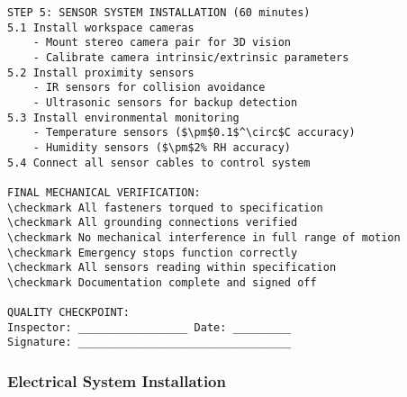 \begin{lstlisting}[basicstyle=\ttfamily\footnotesize, caption={Step-by-Step Mechanical Assembly}, label={lst:app-mechanical}]
STEP 5: SENSOR SYSTEM INSTALLATION (60 minutes)
5.1 Install workspace cameras
    - Mount stereo camera pair for 3D vision
    - Calibrate camera intrinsic/extrinsic parameters
5.2 Install proximity sensors
    - IR sensors for collision avoidance
    - Ultrasonic sensors for backup detection
5.3 Install environmental monitoring
    - Temperature sensors ($\pm$0.1$^\circ$C accuracy)
    - Humidity sensors ($\pm$2% RH accuracy)
5.4 Connect all sensor cables to control system

FINAL MECHANICAL VERIFICATION:
\checkmark All fasteners torqued to specification
\checkmark All grounding connections verified
\checkmark No mechanical interference in full range of motion
\checkmark Emergency stops function correctly
\checkmark All sensors reading within specification
\checkmark Documentation complete and signed off

QUALITY CHECKPOINT:
Inspector: _________________ Date: _________
Signature: _________________________________
\end{lstlisting}

\subsubsection{Electrical System Installation}

